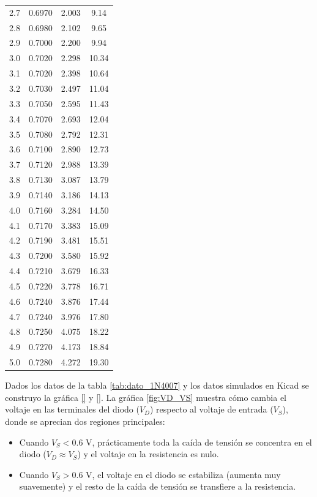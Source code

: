 \documentclass{article}
\begin{document}
\begin{table}[htbp]
\begin{tabular}{cccc}
2.7 & 0.6970 & 2.003 & 9.14 \\
2.8 & 0.6980 & 2.102 & 9.65 \\
2.9 & 0.7000 & 2.200 & 9.94 \\
3.0 & 0.7020 & 2.298 & 10.34 \\
3.1 & 0.7020 & 2.398 & 10.64 \\
3.2 & 0.7030 & 2.497 & 11.04 \\
3.3 & 0.7050 & 2.595 & 11.43 \\
3.4 & 0.7070 & 2.693 & 12.04 \\
3.5 & 0.7080 & 2.792 & 12.31 \\
3.6 & 0.7100 & 2.890 & 12.73 \\
3.7 & 0.7120 & 2.988 & 13.39 \\
3.8 & 0.7130 & 3.087 & 13.79 \\
3.9 & 0.7140 & 3.186 & 14.13 \\
4.0 & 0.7160 & 3.284 & 14.50 \\
4.1 & 0.7170 & 3.383 & 15.09 \\
4.2 & 0.7190 & 3.481 & 15.51 \\
4.3 & 0.7200 & 3.580 & 15.92 \\
4.4 & 0.7210 & 3.679 & 16.33 \\
4.5 & 0.7220 & 3.778 & 16.71 \\
4.6 & 0.7240 & 3.876 & 17.44 \\
4.7 & 0.7240 & 3.976 & 17.80 \\
4.8 & 0.7250 & 4.075 & 18.22 \\
4.9 & 0.7270 & 4.173 & 18.84 \\
5.0 & 0.7280 & 4.272 & 19.30 \\
\bottomrule
\end{tabular}
\end{table}



Dados los datos de la tabla \ref{tab:dato_1N4007} y los datos simulados en Kicad se construyo la gráfica \ref{} y \ref{}.
La gráfica \ref{fig:VD_VS} muestra cómo cambia el voltaje en las terminales del diodo ($V_D$) respecto al voltaje de entrada ($V_S$), donde se aprecian dos regiones principales:

\begin{itemize}
  \item Cuando $V_S < 0.6\text{ V}$, prácticamente toda la caída de tensión se concentra en el diodo ($V_D \approx V_S$) y el voltaje en la resistencia es nulo.
  \item Cuando $V_S > 0.6\text{ V}$, el voltaje en el diodo se estabiliza (aumenta muy suavemente) y el resto de la caída de tensión se transfiere a la resistencia.
\end{itemize}
\end{document}
